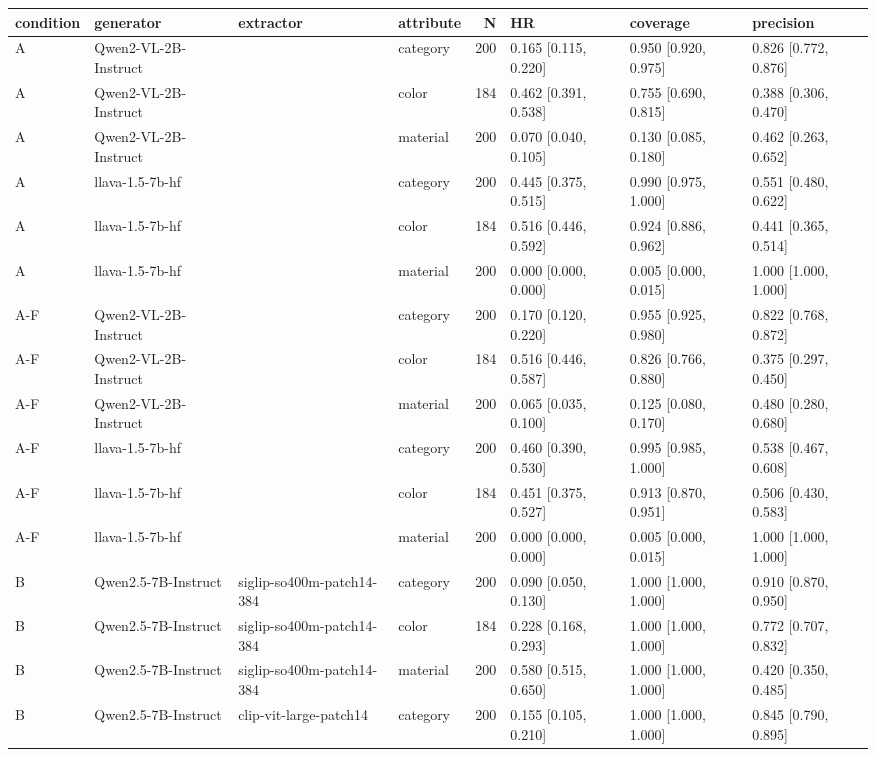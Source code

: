 \begin{tabular}{llllrlll}
\toprule
condition & generator & extractor & attribute & N & HR & coverage & precision \\
\midrule
A & Qwen2-VL-2B-Instruct &  & category & 200 & 0.165 [0.115, 0.220] & 0.950 [0.920, 0.975] & 0.826 [0.772, 0.876] \\
A & Qwen2-VL-2B-Instruct &  & color & 184 & 0.462 [0.391, 0.538] & 0.755 [0.690, 0.815] & 0.388 [0.306, 0.470] \\
A & Qwen2-VL-2B-Instruct &  & material & 200 & 0.070 [0.040, 0.105] & 0.130 [0.085, 0.180] & 0.462 [0.263, 0.652] \\
A & llava-1.5-7b-hf &  & category & 200 & 0.445 [0.375, 0.515] & 0.990 [0.975, 1.000] & 0.551 [0.480, 0.622] \\
A & llava-1.5-7b-hf &  & color & 184 & 0.516 [0.446, 0.592] & 0.924 [0.886, 0.962] & 0.441 [0.365, 0.514] \\
A & llava-1.5-7b-hf &  & material & 200 & 0.000 [0.000, 0.000] & 0.005 [0.000, 0.015] & 1.000 [1.000, 1.000] \\
A-F & Qwen2-VL-2B-Instruct &  & category & 200 & 0.170 [0.120, 0.220] & 0.955 [0.925, 0.980] & 0.822 [0.768, 0.872] \\
A-F & Qwen2-VL-2B-Instruct &  & color & 184 & 0.516 [0.446, 0.587] & 0.826 [0.766, 0.880] & 0.375 [0.297, 0.450] \\
A-F & Qwen2-VL-2B-Instruct &  & material & 200 & 0.065 [0.035, 0.100] & 0.125 [0.080, 0.170] & 0.480 [0.280, 0.680] \\
A-F & llava-1.5-7b-hf &  & category & 200 & 0.460 [0.390, 0.530] & 0.995 [0.985, 1.000] & 0.538 [0.467, 0.608] \\
A-F & llava-1.5-7b-hf &  & color & 184 & 0.451 [0.375, 0.527] & 0.913 [0.870, 0.951] & 0.506 [0.430, 0.583] \\
A-F & llava-1.5-7b-hf &  & material & 200 & 0.000 [0.000, 0.000] & 0.005 [0.000, 0.015] & 1.000 [1.000, 1.000] \\
B & Qwen2.5-7B-Instruct & siglip-so400m-patch14-384 & category & 200 & 0.090 [0.050, 0.130] & 1.000 [1.000, 1.000] & 0.910 [0.870, 0.950] \\
B & Qwen2.5-7B-Instruct & siglip-so400m-patch14-384 & color & 184 & 0.228 [0.168, 0.293] & 1.000 [1.000, 1.000] & 0.772 [0.707, 0.832] \\
B & Qwen2.5-7B-Instruct & siglip-so400m-patch14-384 & material & 200 & 0.580 [0.515, 0.650] & 1.000 [1.000, 1.000] & 0.420 [0.350, 0.485] \\
B & Qwen2.5-7B-Instruct & clip-vit-large-patch14 & category & 200 & 0.155 [0.105, 0.210] & 1.000 [1.000, 1.000] & 0.845 [0.790, 0.895] \\

\end{tabular}
